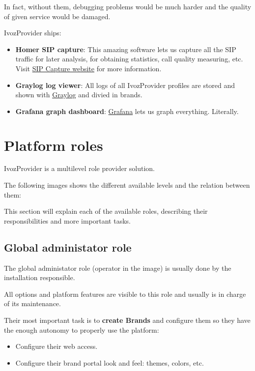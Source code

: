 \documentclass[letterpaper,10pt,english]{sphinxmanual}
\begin{document}
In fact, without them, debugging problems would be much harder and the quality
of given service would be damaged.

IvozProvider ships:
\begin{itemize}
\item {} 
\textbf{Homer SIP capture}: This amazing software lets us capture all the SIP traffic
for later analysis, for obtaining statistics, call quality measuring, etc.
Visit \href{http://sipcapture.org/}{SIP Capture website} for more information.

\item {} 
\textbf{Graylog log viewer}: All logs of all IvozProvider profiles are stored and
shown with \href{https://www.graylog.org/}{Graylog} and divied in brands.

\item {} 
\textbf{Grafana graph dashboard}: \href{http://grafana.org/}{Grafana} lets us graph
everything. Literally.

\end{itemize}


\chapter{Platform roles}
\label{operation_roles/index:operation-roles}\label{operation_roles/index::doc}\label{operation_roles/index:platform-roles}
IvozProvider is a multilevel role provider solution.

The following images shows the different available levels and the
relation between them:

\noindent{}

This section will explain each of the available roles, describing their
responsibilities and more important tasks.


\section{Global administator role}
\label{operation_roles/index:global-administator-role}
The global administator role (operator in the image) is usually done by
the installation responsible.

All options and platform features are visible to this role and usually is
in charge of its maintenance.

Their most important task is to \textbf{create Brands} and configure them so
they have the enough autonomy to properly use the platform:
\begin{itemize}
\item {} 
Configure their web access.

\item {} 
Configure their brand portal look and feel: themes, colors, etc.

\end{itemize}
\end{document}
